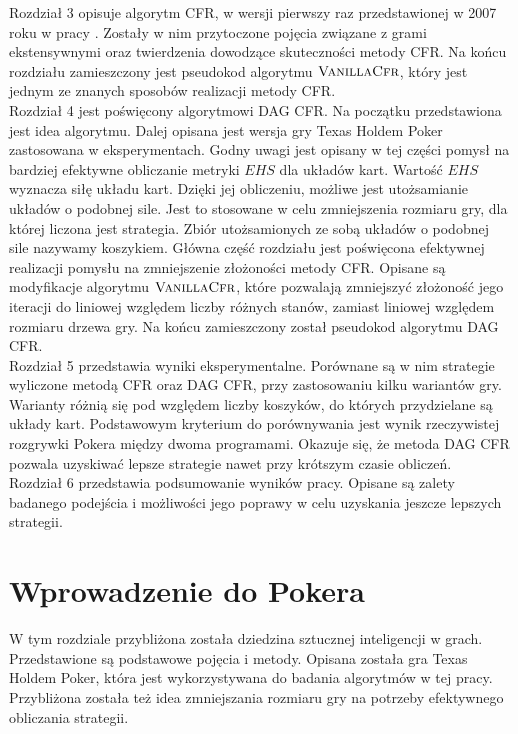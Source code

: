 \documentclass[magisterska]{pracamgr}
\begin{document}
\noindent
Rozdział 3 opisuje algorytm CFR, w wersji pierwszy raz przedstawionej w 2007 roku w pracy \cite{cfr}.
Zostały w nim przytoczone pojęcia
związane z grami ekstensywnymi oraz twierdzenia dowodzące skuteczności metody CFR. Na końcu rozdziału
zamieszczony jest pseudokod algorytmu $\Call{VanillaCfr}{}$, który jest jednym ze znanych sposobów realizacji metody CFR. \\

\noindent
Rozdział 4 jest poświęcony algorytmowi DAG CFR. Na początku przedstawiona jest idea algorytmu.
Dalej opisana jest wersja gry Texas Holdem Poker zastosowana w eksperymentach. Godny uwagi
jest opisany w tej części pomysł na bardziej efektywne obliczanie metryki $EHS$ dla układów kart.
Wartość $EHS$ wyznacza siłę układu kart. Dzięki jej obliczeniu, możliwe jest utożsamianie układów
o podobnej sile. Jest to stosowane w celu zmniejszenia rozmiaru gry, dla której liczona jest strategia.
Zbiór utożsamionych ze sobą układów o podobnej sile nazywamy koszykiem.
Główna część rozdziału jest poświęcona efektywnej realizacji pomysłu na zmniejszenie złożoności
metody CFR. Opisane są modyfikacje algorytmu $\Call{VanillaCfr}{}$, które pozwalają zmniejszyć złożoność
jego iteracji do liniowej względem liczby różnych stanów, zamiast liniowej względem rozmiaru drzewa gry.
Na końcu zamieszczony został pseudokod algorytmu DAG CFR. \\

\noindent
Rozdział 5 przedstawia wyniki eksperymentalne. Porównane są w nim strategie wyliczone metodą
CFR oraz DAG CFR, przy zastosowaniu kilku wariantów gry. Warianty różnią się pod względem
liczby koszyków, do których przydzielane są układy kart. Podstawowym kryterium
do porównywania jest wynik rzeczywistej rozgrywki Pokera między dwoma programami. Okazuje się,
że metoda DAG CFR pozwala uzyskiwać lepsze strategie nawet przy krótszym czasie obliczeń. \\

\noindent
Rozdział 6 przedstawia podsumowanie wyników pracy. Opisane są zalety badanego podejścia
i możliwości jego poprawy w celu uzyskania jeszcze lepszych strategii.

\chapter{Wprowadzenie do Pokera}

\noindent
W tym rozdziale przybliżona została dziedzina sztucznej inteligencji w grach. Przedstawione
są podstawowe pojęcia i metody. Opisana została gra Texas Holdem Poker, która jest
wykorzystywana do badania algorytmów w tej pracy. Przybliżona została też idea
zmniejszania rozmiaru gry na potrzeby efektywnego obliczania strategii.
\end{document}
